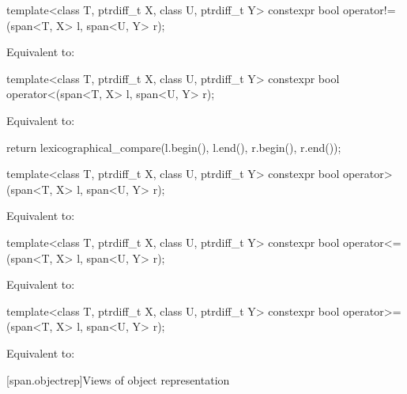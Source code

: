 \begin{codeblock}
\begin{codeblock}
\begin{codeblock}
%
\begin{itemdecl}
template<class T, ptrdiff_t X, class U, ptrdiff_t Y>
  constexpr bool operator!=(span<T, X> l, span<U, Y> r);
\end{itemdecl}
\begin{itemdescr}
\pnum
\effects
Equivalent to: 
\end{itemdescr}

%
\begin{itemdecl}
template<class T, ptrdiff_t X, class U, ptrdiff_t Y>
  constexpr bool operator<(span<T, X> l, span<U, Y> r);
\end{itemdecl}
\begin{itemdescr}
\pnum
\effects
Equivalent to:
\begin{codeblock}
return lexicographical_compare(l.begin(), l.end(), r.begin(), r.end());
\end{codeblock}
\end{itemdescr}

%
\begin{itemdecl}
template<class T, ptrdiff_t X, class U, ptrdiff_t Y>
  constexpr bool operator>(span<T, X> l, span<U, Y> r);
\end{itemdecl}
\begin{itemdescr}
\pnum
\effects
Equivalent to: 
\end{itemdescr}

%
\begin{itemdecl}
template<class T, ptrdiff_t X, class U, ptrdiff_t Y>
  constexpr bool operator<=(span<T, X> l, span<U, Y> r);
\end{itemdecl}
\begin{itemdescr}
\pnum
\effects
Equivalent to: 
\end{itemdescr}

%
\begin{itemdecl}
template<class T, ptrdiff_t X, class U, ptrdiff_t Y>
  constexpr bool operator>=(span<T, X> l, span<U, Y> r);
\end{itemdecl}
\begin{itemdescr}
\pnum
\effects
Equivalent to: 
\end{itemdescr}

[span.objectrep]{Views of object representation}


\end{codeblock}
\end{codeblock}
\end{codeblock}
